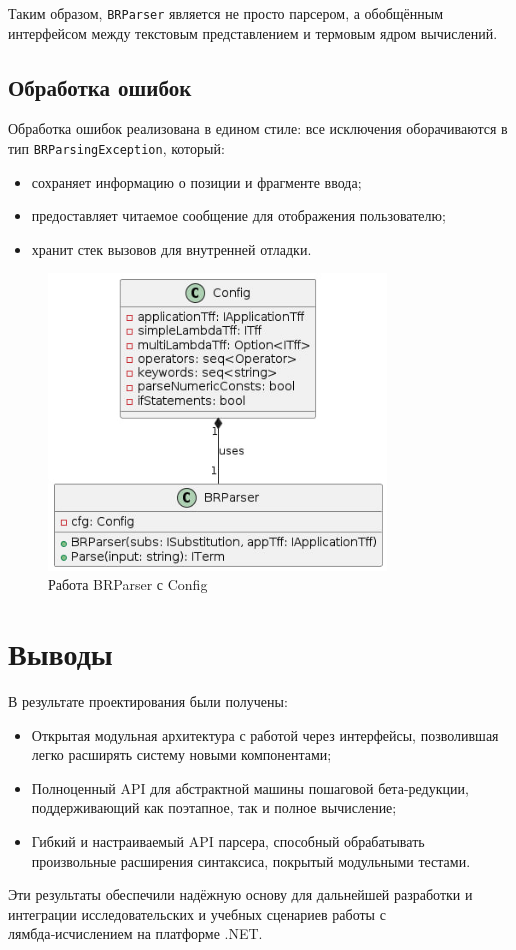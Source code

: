 Таким образом, \texttt{BRParser} является не просто парсером, а обобщённым интерфейсом между текстовым представлением и термовым ядром вычислений.

\subsection{Обработка ошибок}

Обработка ошибок реализована в едином стиле: все исключения оборачиваются в тип \texttt{BRParsingException}, который:

\begin{itemize}
  \item сохраняет информацию о позиции и фрагменте ввода;
  \item предоставляет читаемое сообщение для отображения пользователю;
  \item хранит стек вызовов для внутренней отладки.
\end{itemize}

\begin{figure}[h]
  \centering
  \includegraphics[width=0.8\textwidth]{./img/Config.jpg}
  \caption{Работа BRParser с Config}
  \label{fig:config}
\end{figure}


\section{Выводы}

В результате проектирования были получены:
\begin{itemize}
  \item Открытая модульная архитектура с работой через интерфейсы, позволившая легко расширять систему новыми компонентами;
  \item Полноценный API для абстрактной машины пошаговой бета‑редукции, поддерживающий как поэтапное, так и полное вычисление;
  \item Гибкий и настраиваемый API парсера, способный обрабатывать произвольные расширения синтаксиса, покрытый модульными тестами.
\end{itemize}

Эти результаты обеспечили надёжную основу для дальнейшей разработки и интеграции исследовательских и учебных сценариев работы с лямбда‑исчислением на платформе .NET.
